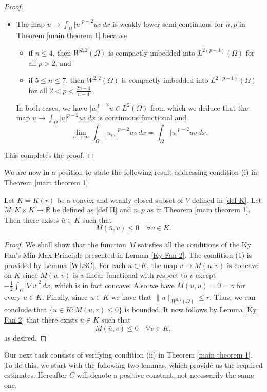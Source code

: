 \documentclass[reqno]{amsart}
\begin{document}
\begin{proof}
\begin{itemize}
\item The map \( u\to\int_{\Omega}|u|^{p-2}uv\,dx\) is weakly lower semi-continuous for
\( n,p \) in Theorem \ref{main theorem 1} because
\begin{itemize}
   \item[(i)] if \(n\leq 4\), then  \(W^{2,2}(\Omega)\) is compactly  imbedded into
   \( L^{2(p-1)}(\Omega)\) for all \(  p>2\), and
   \item[(ii)] if \(5\leq n\leq 7\), then \(W^{2,2}(\Omega)\) is compactly imbedded
   into \( L^{2(p-1)}(\Omega)\) for all \( 2<p< \frac{2n-4}{n-4}\).
\end{itemize}
In both cases, we have  $|u|^{p-2}u\in L^2(\Omega) $ from which we deduce that the map
\( u\to\int_{\Omega}|u|^{p-2}uv\,dx\) is continuous functional and
\[
\lim_{n\to \infty}
\int_{\Omega}|u_m|^{p-2}uv\,dx= \int_{\Omega}|u|^{p-2}uv\,dx.
 \]
\end{itemize}
This completes the proof.
\end{proof}

We are now in a position to state the following result addressing condition (i)
in Theorem \ref{main theorem 1}.

\begin{lemma}\label{cond i}
Let \( K=K(r)\) be a convex and weakly closed subset of \(V\) defined in \eqref{def K}.
Let \( M : K \times K \to\mathbb{R}\) be defined as \eqref{def II} and \(n,p\) as in
Theorem \ref{main theorem 1}. Then there exists \(\bar{u} \in K\)    such that
\[M(\bar{u}, v)\leq 0\quad  \forall v\in  K.\]
\end{lemma}

\begin{proof}
 We shall show that the function \(M\) satisfies all the conditions of the Ky Fan's
Min-Max Principle presented in Lemma \ref{Ky Fan 2}.
The condition (1) is provided by Lemma \ref{WLSC}. For
each \(u\in K\), the map \(v \to M(u, v)\) is concave on \(K\) since \(M(u, v)\) is a
linear functional with respect to \(v\) except
\( -\frac{1}{2}\int_{\Omega} |\nabla v|^2\,dx\), which is in fact concave.
 Also we have \( M(u, u) = 0 = \gamma\) for every \(u \in K\). Finally, since
\(u\in K\) we have that \(\rVert u \rVert_{ W^{2,2}(\Omega)}\leq r\).
Thus, we can conclude that
\( \{u \in K : M(u, v) \leq 0\}\) is bounded. It now follows by Lemma \ref{Ky Fan 2}
that there exists \(\bar{u} \in K\) such that
\[
M(\bar{u}, v)\leq 0\quad  \forall v\in  K,
\]
as desired.
\end{proof}

Our next task consists of verifying condition (ii) in Theorem \ref{main theorem 1}.
To do this, we start with the following two lemmas, which provide us the required
estimates.
Hereafter $C$ will denote a positive constant, not necessarily the same one.
\end{document}
